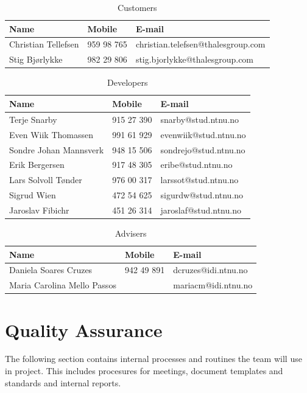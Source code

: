 \begin{table}[!ht] \footnotesize \center
\caption{Customers\label{tab:part_cust}}
\begin{tabular}{l l l}
	\toprule
	Name & Mobile & E-mail \\ 
	\midrule
	Christian Tellefsen & 959 98 765 & christian.telefsen@thalesgroup.com \\ 
	Stig Bjørlykke & 982 29 806 & stig.bjorlykke@thalesgroup.com \\ 
	\bottomrule
\end{tabular}
\end{table}

\begin{table}[!ht] \footnotesize \center
\caption{Developers\label{tab:part_dev}}
\begin{tabular}{l l l}
	\toprule
	Name & Mobile & E-mail  \\ 
	\midrule
	Terje Snarby & 915 27 390 & snarby@stud.ntnu.no \\ 
	Even Wiik Thomassen & 991 61 929 & evenwiik@stud.ntnu.no \\ 
	Sondre Johan Mannsverk & 948 15 506 & sondrejo@stud.ntnu.no \\ 
	Erik Bergersen & 917 48 305 & eribe@stud.ntnu.no \\ 
	Lars Solvoll Tønder & 976 00 317 & larssot@stud.ntnu.no \\ 
	Sigrud Wien & 472 54 625 & sigurdw@stud.ntnu.no \\ 
	Jaroslav Fibichr & 451 26 314 & jaroslaf@stud.ntnu.no \\ 
	\bottomrule
\end{tabular}
\end{table}

\begin{table}[!ht] \footnotesize \center
\caption{Advisers\label{tab:part_adv}}
\begin{tabular}{l l l}
	\toprule
	Name & Mobile & E-mail  \\ 
	\midrule
	Daniela Soares Cruzes & 942 49 891 & dcruzes@idi.ntnu.no \\ 
	Maria Carolina Mello Passos & & mariacm@idi.ntnu.no \\ 
	\bottomrule
\end{tabular}
\end{table}

\section{Quality Assurance}
The following section contains internal processes and routines the team will use in project. This includes procesures for meetings, document templates and standards and internal reports.

